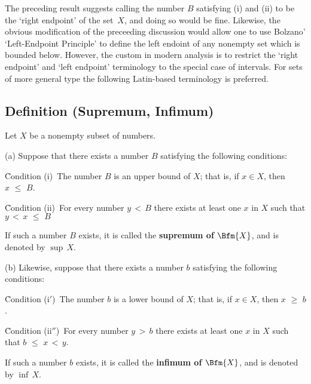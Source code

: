 \VV

        The preceding result suggests calling the number $B$ satisfying (i) and (ii) to be the `right endpoint' of the set~$X$, and doing so would be fine.
    Likewise, the obvious modification of the preceeding discussion would allow one to use
    Bolzano' `Left-Endpoint Principle' to define the left endoint of any nonempty set which is bounded below.
    However, the custom in modern analysis is to restrict the `right endpoint' and `left endpoint' terminology to the special case of intervals.
    For sets of more general type the following Latin-based terminology is preferred.

\V

            \subsection{\small{{\bf Definition (Supremum, Infimum)}}}
            \label{DefB30.08A} 
\V

        Let $X$ be a nonempty subset of numbers.

\V

        (a) Suppose that there exists a number $B$ satisfying the following conditions:

\VA

        \h Condition (i)\, The number $B$ is an upper bound of $X$; that is, if $x{\in}X$, then $x\,\,{\leq}\,\,B$.

        \h Condition (ii)\, For every number $y\,<\,B$ there exists at least one $x$ in $X$ such that $y\,<\,x\,\,{\leq}\,\,B$

\VA

        If such a number $B$ exists, it is called the {\bf supremum of $\Bfm{X}$}, and is denoted by ${\sup}\,X$.

\V

        (b) Likewise, suppose that there exists a number $b$ satisfying the following conditions:

\VA

        \h Condition (i$'$)\, The number $b$ is a lower bound of $X$; that is, if $x{\in}X$, then $x\,\,{\geq}\,\,b$.

        \h Condition (ii$''$)\, For every number $y\,>\,b$ there exists at least one $x$ in $X$ such that $b\,\,{\leq}\,\,x\,<\,y$.

\VA

        If such a number $b$ exists, it is called the {\bf infimum of $\Bfm{X}$}, and is denoted by ${\inf}\,X$.


